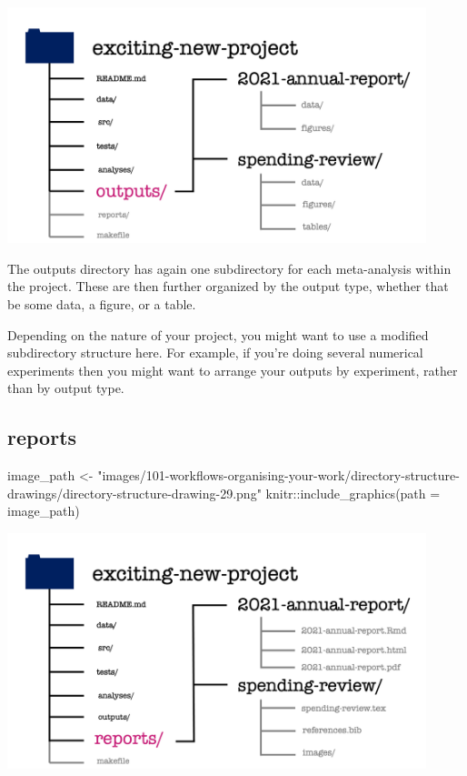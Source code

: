 \documentclass[
  letterpaper,
  DIV=11,
  numbers=noendperiod]{scrreprt}
\newenvironment{Shaded}{\begin{snugshade}}{\end{snugshade}}
\newcommand{\AttributeTok}[1]{\textcolor[rgb]{0.40,0.45,0.13}{#1}}
\newcommand{\FunctionTok}[1]{\textcolor[rgb]{0.28,0.35,0.67}{#1}}
\newcommand{\NormalTok}[1]{\textcolor[rgb]{0.00,0.23,0.31}{#1}}
\newcommand{\OtherTok}[1]{\textcolor[rgb]{0.00,0.23,0.31}{#1}}
\newcommand{\SpecialCharTok}[1]{\textcolor[rgb]{0.37,0.37,0.37}{#1}}
\newcommand{\StringTok}[1]{\textcolor[rgb]{0.13,0.47,0.30}{#1}}
\begin{document}
\includegraphics[width=4.8in,height=\textheight]{images/101-workflows-organising-your-work/directory-structure-drawings/directory-structure-drawing-26.png}

The outputs directory has again one subdirectory for each meta-analysis
within the project. These are then further organized by the output type,
whether that be some data, a figure, or a table.

Depending on the nature of your project, you might want to use a
modified subdirectory structure here. For example, if you're doing
several numerical experiments then you might want to arrange your
outputs by experiment, rather than by output type.

\subsection{reports}\label{reports}

\begin{Shaded}
\begin{Highlighting}[]
\NormalTok{image\_path }\OtherTok{\textless{}{-}} \StringTok{"images/101{-}workflows{-}organising{-}your{-}work/directory{-}structure{-}drawings/directory{-}structure{-}drawing{-}29.png"}
\NormalTok{knitr}\SpecialCharTok{::}\FunctionTok{include\_graphics}\NormalTok{(}\AttributeTok{path =}\NormalTok{ image\_path)}
\end{Highlighting}
\end{Shaded}

\includegraphics[width=4.8in,height=\textheight]{images/101-workflows-organising-your-work/directory-structure-drawings/directory-structure-drawing-29.png}
\end{document}
